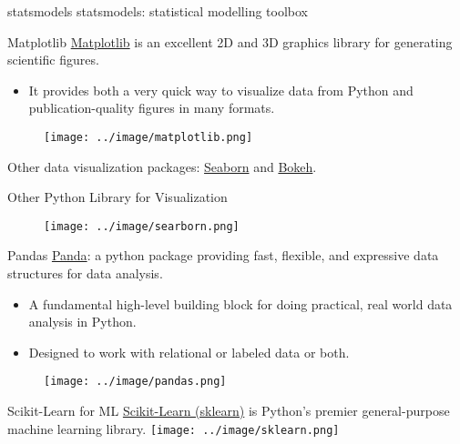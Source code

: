 \documentclass{bredelebeamer}
\begin{document}
\begin{frame}{statsmodels}
statsmodels: statistical modelling toolbox 

\end{frame}	


\begin{frame}{Matplotlib}
\href{https://matplotlib.org/}{Matplotlib} is an excellent 2D and 3D graphics library for generating scientific figures.
 \begin{itemize}
 	\item It provides both a very quick way to visualize data from Python and publication-quality figures in many formats.
 \end{itemize}
 \begin{figure}[h]
		\texttt{[image: ../image/matplotlib.png]}
		\label{fig:result1}
\end{figure}
Other data visualization packages: \href{https://seaborn.pydata.org/}{Seaborn} and \href{http://bokeh.pydata.org/en/latest/}{Bokeh}.
\end{frame}

\begin{frame}{Other Python Library for Visualization}
 \begin{figure}{}
\texttt{[image: ../image/searborn.png]}
\end{figure}
\end{frame}

\begin{frame}{Pandas}
\href{http://pandas.pydata.org/}{Panda}: a python package providing fast, flexible, and expressive data structures for data analysis.
\begin{itemize}
	\item A fundamental high-level building block for doing practical, real world data analysis in Python.
	\item Designed to work with relational or labeled data or both.
\end{itemize}	
\begin{figure}[h]
		\texttt{[image: ../image/pandas.png]}
\end{figure}
\end{frame}


\begin{frame}{Scikit-Learn for ML}
\href{http://scikit-learn.org/}{Scikit-Learn (sklearn)} is Python's premier general-purpose machine learning library. 
\centering
\texttt{[image: ../image/sklearn.png]}
\end{frame}
\end{document}
